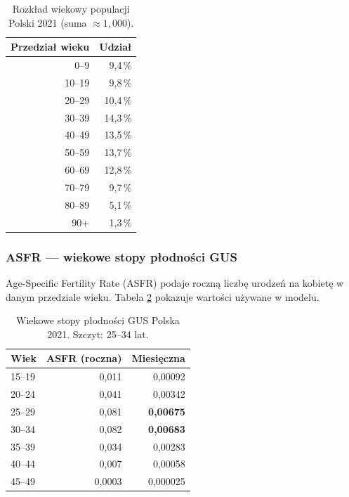 \documentclass[11pt,a4paper]{article}
\begin{document}
\begin{table}[h]
\centering
\small
\begin{tabular}{rr}
\toprule
\textbf{Przedział wieku} & \textbf{Udział} \\
\midrule
 0--9  & 9{,}4\,\% \\
10--19 & 9{,}8\,\% \\
20--29 & 10{,}4\,\% \\
30--39 & 14{,}3\,\% \\
40--49 & 13{,}5\,\% \\
50--59 & 13{,}7\,\% \\
60--69 & 12{,}8\,\% \\
70--79 & 9{,}7\,\% \\
80--89 & 5{,}1\,\% \\
90+    & 1{,}3\,\% \\
\bottomrule
\end{tabular}
\caption{Rozkład wiekowy populacji Polski 2021 (suma $\approx 1{,}000$).}
\label{tab:agedist}
\end{table}

\subsubsection{ASFR --- wiekowe stopy płodności GUS}

Age-Specific Fertility Rate (ASFR) podaje roczną liczbę urodzeń na kobietę w danym przedziale wieku. Tabela \ref{tab:fertility} pokazuje wartości używane w modelu.

\begin{table}[h]
\centering
\small
\begin{tabular}{lrr}
\toprule
\textbf{Wiek} & \textbf{ASFR (roczna)} & \textbf{Miesięczna} \\
\midrule
15--19 & 0{,}011 & 0{,}00092 \\
20--24 & 0{,}041 & 0{,}00342 \\
25--29 & 0{,}081 & \textbf{0{,}00675} \\
30--34 & 0{,}082 & \textbf{0{,}00683} \\
35--39 & 0{,}034 & 0{,}00283 \\
40--44 & 0{,}007 & 0{,}00058 \\
45--49 & 0{,}0003 & 0{,}000025 \\
\bottomrule
\end{tabular}
\caption{Wiekowe stopy płodności GUS Polska 2021. Szczyt: 25--34 lat.}
\label{tab:fertility}
\end{table}
\end{document}
